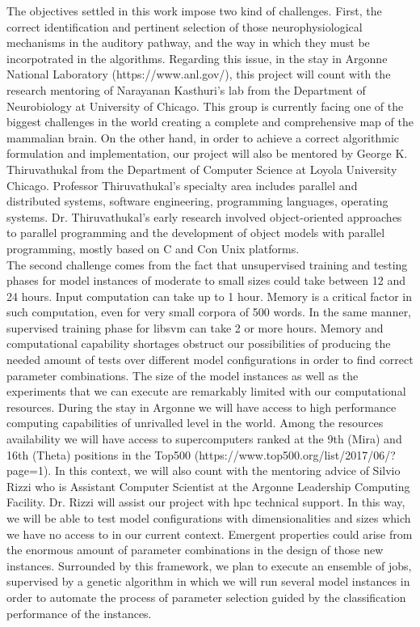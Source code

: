 \documentclass[11pt,a4paper]{article}
\newcommand{\CC}{C\nolinebreak\hspace{-.05em}\raisebox{.4ex}{\tiny\bf +}\nolinebreak\hspace{-.10em}\raisebox{.4ex}{\tiny\bf +}}
\begin{document}
The objectives settled in this work impose two kind of challenges.
First, the correct identification and pertinent selection of those neurophysiological
mechanisms in the auditory pathway, and the way in which they must be incorpotrated
in the algorithms.
Regarding this issue, in the stay in Argonne National Laboratory (https://www.anl.gov/),
this project will count with the
research mentoring of Narayanan Kasthuri's lab
from the Department of Neurobiology at University of Chicago.
This group is currently facing one of the biggest challenges in the world 
creating a complete and comprehensive map of the mammalian brain.
On the other hand, in order to achieve a correct algorithmic formulation and implementation,
our project will also be mentored by
George K. Thiruvathukal from the Department of Computer Science at
Loyola University Chicago.
Professor Thiruvathukal's specialty area includes
parallel and distributed systems, software engineering, programming languages, operating systems.
Dr. Thiruvathukal's early research involved object-oriented approaches to parallel programming
and the development of object models with parallel programming, mostly based on C and \CC  on Unix platforms. \\

The second challenge comes from the fact that
unsupervised training and testing phases for model instances of moderate to small sizes
could take between 12 and 24 hours.
Input computation can take up to 1 hour.
Memory is a critical factor in such computation,
even for very small corpora of 500 words.
In the same manner, supervised training phase for \gls{libsvm} can take 2 or more hours.
Memory and computational capability shortages obstruct our possibilities of producing
the needed amount of tests over different model configurations in order to find correct
parameter combinations.
The size of the model instances as well as the experiments that we can execute
are remarkably limited with our computational resources.
During the stay in Argonne we will have access
to high performance computing capabilities of unrivalled level in the world.
Among the resources availability we will have access to supercomputers
ranked at the 9th (Mira) and 16th (Theta) positions in the Top500
(https://www.top500.org/list/2017/06/?page=1).
In this context, we will also count with the mentoring advice of Silvio Rizzi
who is Assistant Computer Scientist at the Argonne Leadership Computing Facility.
Dr. Rizzi will assist our project with \gls{hpc} technical support.
In this way, we will be able to test model configurations
with dimensionalities and sizes which we have no access to in our current context.
Emergent properties could arise from the enormous amount of parameter combinations in the design
of those new instances.
Surrounded by this framework, we plan to execute an ensemble of jobs,
supervised by a genetic algorithm in which we will run several model instances
in order to automate the process of parameter selection guided by the
classification performance of the instances. \\
\end{document}
